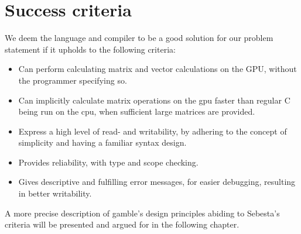 \section{Success criteria}\label{sec:OurCriterias}
We deem the language and compiler to be a good solution for our problem statement if it upholds to the following criteria:

\begin{itemize}
	\item Can perform calculating matrix and vector calculations on the GPU, without the programmer specifying so.
	\item Can implicitly calculate matrix operations on the \acrshort{gpu} faster than regular C being run on the \acrshort{cpu}, when sufficient large matrices are provided.
	\item Express a high level of read- and writability, by adhering to the concept of simplicity and having a familiar syntax design.
	\item Provides reliability, with type and scope checking.
	\item Gives descriptive and fulfilling error messages, for easier debugging, resulting in better writability.
\end{itemize}

A more precise description of \gls{gamble}'s design principles abiding to Sebesta's criteria will be presented and argued for in the following chapter.

